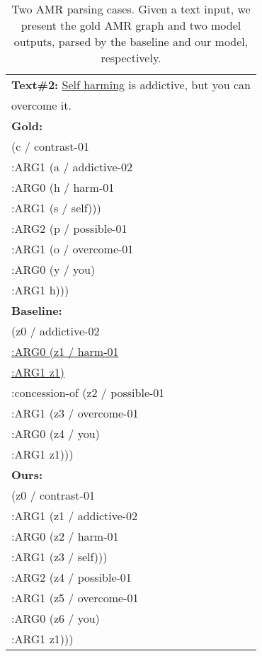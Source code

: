 \documentclass[11pt]{article}
\begin{document}
\begin{table}[!t]
\begin{tabular}{l}
    \textbf{Text\#2:} \underline{Self harming} is addictive, but you can\\ \quad\quad overcome it. \\
    \midrule
    \textbf{Gold:} \\
    \quad (c / contrast-01   \\
        \quad\quad :ARG1 (a / addictive-02 \\
            \quad\quad\quad :ARG0 (h / harm-01 \\
            \quad\quad\quad\quad :ARG1 (s / self)))\\
      \quad\quad :ARG2 (p / possible-01 \\
            \quad\quad\quad :ARG1 (o / overcome-01 \\
            \quad\quad\quad\quad :ARG0 (y / you) \\
            \quad\quad\quad\quad  :ARG1 h))) \\
    \midrule\textbf{Baseline:} \\
    \quad (z0 / addictive-02  \\
        \quad\quad \underline{:ARG0 (z1 / harm-01} \\
            \quad\quad\quad \underline{:ARG1 z1)}\\
      \quad\quad :concession-of (z2 / possible-01 \\
            \quad\quad\quad :ARG1 (z3 / overcome-01 \\
            \quad\quad\quad\quad :ARG0 (z4 / you) \\
            \quad\quad\quad\quad  :ARG1 z1))) \\
    \midrule\textbf{Ours:} \\
    \quad (z0 / contrast-01   \\
        \quad\quad :ARG1 (z1 / addictive-02 \\
            \quad\quad\quad :ARG0 (z2 / harm-01 \\
            \quad\quad\quad\quad :ARG1 (z3 / self)))\\
      \quad\quad :ARG2 (z4 / possible-01 \\
            \quad\quad\quad :ARG1 (z5 / overcome-01 \\
            \quad\quad\quad\quad :ARG0 (z6 / you) \\
            \quad\quad\quad\quad  :ARG1 z1))) \\
    \bottomrule
    \end{tabular}
    \caption{Two AMR parsing cases. Given a text input, we present the gold AMR graph and two model outputs, parsed by the baseline and our model, respectively.}
    \label{tab:case-parsing-single}
\end{table}
\end{document}

